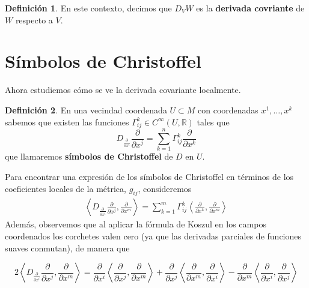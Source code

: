 \documentclass[spanish]{book}
\theoremstyle{definition}
\newtheorem*{defn}{Definición}
\newcommand{\R}{\mathbb{R}}
\newcommand{\Cinf}{C^\infty}
\begin{document}
	\begin{defn}
		En este contexto, decimos que $D_VW$ es la \textbf{derivada covriante} de $W$ respecto a $V$.
	\end{defn}
	\section{Símbolos de Christoffel}
	Ahora estudiemos cómo se ve la derivada covariante localmente.
	\begin{defn}
		En una vecindad coordenada $U\subset M$ con coordenadas $x^1,\ldots,x^k$ sabemos que existen las funciones $\Gamma^k_{ij}\in\Cinf(U,\R)$ tales que
		\[D_{\frac{\partial}{\partial x^i}}\frac{\partial}{\partial x^j}=\sum_{k=1}^n\Gamma^k_{ij}\frac{\partial}{\partial x^k}\]
		que llamaremos \textbf{símbolos de Christoffel} de $D$ en $U$.
	\end{defn}
	Para encontrar una expresión de los símbolos de Christoffel en términos de los coeficientes locales de la métrica, $g_{ij}$, consideremos 
	\begin{align*}
		\left\langle D_{\frac{\partial}{\partial x^i}}\frac{\partial}{\partial x^j},\frac{\partial}{\partial x^m}\right\rangle=\sum_{k=1}^m\Gamma_{ij}^k\left\langle\frac{\partial}{\partial x^k},\frac{\partial}{\partial x^m}\right\rangle
	\end{align*}
	Además, observemos que al aplicar la fórmula de Koszul en los campos coordenados los corchetes valen cero (ya que las derivadas parciales de funciones suaves conmutan), de manera que
	
	\begin{equation}\label{eq:kozszul-coords}
		2\left\langle D_{\frac{\partial}{\partial x^i}}\frac{\partial}{\partial x^j},\frac{\partial}{\partial x^m}\right\rangle=\frac{\partial}{\partial x^i}\left\langle \frac{\partial}{\partial x^j},\frac{\partial}{\partial x^m}\right\rangle+\frac{\partial}{\partial x^j}\left\langle \frac{\partial}{\partial x^m},\frac{\partial}{\partial x^i}\right\rangle-\frac{\partial}{\partial x^m}\left\langle \frac{\partial}{\partial x^i},\frac{\partial}{\partial x^j}\right\rangle
	\end{equation}
	
\end{document}

